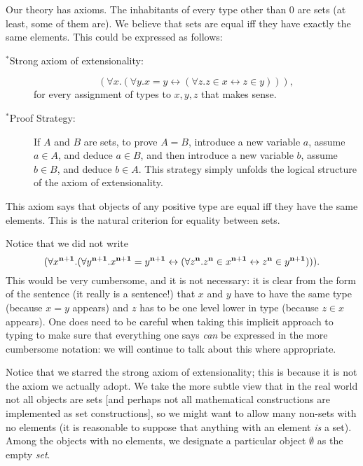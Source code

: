 \documentclass[12pt]{book}
\begin{document}
Our theory has axioms.  The inhabitants of every type other than 0 are sets (at least, some of them are).
We believe that sets are equal iff they have exactly the same elements.
This could be expressed as follows:

\begin{description}

\item[$^*$Strong axiom of extensionality:] $$(\forall x.(\forall y.x=y \leftrightarrow
(\forall z.z \in x \leftrightarrow z \in y))),$$ for every assignment of types
to $x,y,z$ that makes sense.

\item[$^*$Proof Strategy:] If $A$ and $B$ are sets, to prove $A=B$,
introduce a new variable $a$, assume $a \in A$, and deduce $a \in B$,
and then introduce a new variable $b$, assume $b \in B$, and deduce $b
\in A$.  This strategy simply unfolds the logical structure of the
axiom of extensionality.

\end{description}

This axiom says that objects of any positive type are equal iff they
have the same elements.  This is the natural criterion for equality
between sets.

Notice that we did not write $$(\forall x^{\bf n+1}.(\forall
y^{\bf n+1}.x^{\bf n+1}=y^{\bf n+1} \leftrightarrow (\forall z^{\bf n}.z^{\bf n} \in x^{\bf n+1} \leftrightarrow z^{\bf n}
\in y^{\bf n+1}))).$$ This would be very cumbersome, and it is not
necessary: it is clear from the form of the sentence (it really is a
sentence!)  that $x$ and $y$ have to have the same type (because $x=y$
appears) and $z$ has to be one level lower in type (because $z \in x$
appears).  One does need to be careful when taking this implicit
approach to typing to make sure that everything one says {\em can\/}
be expressed in the more cumbersome notation:  we will continue to talk about this where appropriate.


Notice that we starred the strong axiom of extensionality; this is
because it is not the axiom we actually adopt.  We take the more
subtle view that in the real world not all objects are sets [and perhaps not all mathematical constructions are implemented as set constructions], so we
might want to allow many non-sets with no elements (it is reasonable
to suppose that anything with an element {\em is\/} a set).  Among the
objects with no elements, we designate a particular object $\emptyset$
as the empty {\em set\/}.
\end{document}
